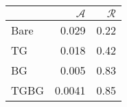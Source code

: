 \begin{tabular}{lrr}
\toprule
 & $\mathcal{A}$ & $\mathcal{R}$ \\
\midrule
Bare & 0.029 & 0.22 \\
TG & 0.018 & 0.42 \\
BG & 0.005 & 0.83 \\
TGBG & 0.0041 & 0.85 \\
\bottomrule
\end{tabular}
